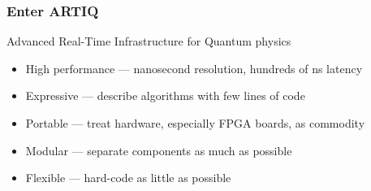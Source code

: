 \documentclass[final,presentation,compress]{beamer}
\begin{document}
\begin{frame}
\end{frame}

\begin{frame}
  \frametitle{Enter ARTIQ}
  \alert{A}dvanced \alert{R}eal-\alert{T}ime \alert{I}nfrastructure for \alert{Q}uantum physics

  \footnotesize
  \begin{itemize}
    \item High performance --- nanosecond resolution, hundreds of ns latency
    \item Expressive --- describe algorithms with few lines of code
    \item Portable --- treat hardware, especially FPGA boards, as commodity
    \item Modular --- separate components as much as possible
    \item Flexible --- hard-code as little as possible
  \end{itemize}
\end{frame}
\end{document}
